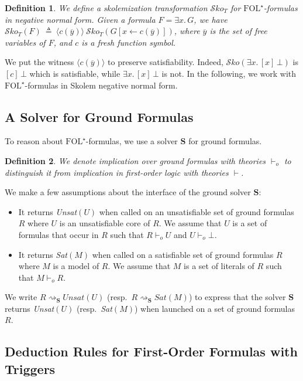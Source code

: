 \documentclass[]{easychair}
\newcommand{\GS}{\mathbf{S}}
\newcommand{\FOLT}{\mathrm{FOL}^\star}
\newcommand{\iFOL}{\vdash}
\newcommand{\sko}{\mathcal{S}\mathit{ko}}
\newcommand{\la}{\langle} \newcommand{\ra}{\rangle}
\newcommand{\eqdef}{\:\triangleq\:}
\newcommand{\beforesub}{\vspace{0cm}}
\newcommand{\aftersub}{\vspace{0cm}}
\newtheorem{definition}{Definition}[section]
\begin{document}
\begin{definition} We define a \emph{skolemization transformation} $\sko_T$
for $\FOLT$-for\-mu\-las in negative normal form.
Given a formula $F=\exists x.\,G$, we have
$\sko_T(F)\eqdef\la c(\overline y)\ra~\sko_T(G[x\leftarrow c(\overline y)])$,
where $\overline y$ is the set of free variables of $F$, and $c$ is a fresh
function symbol.
\end{definition}
We put the witness $\la c(\overline y)\ra$ to
preserve satisfiability. Indeed, $\sko(\exists x.\,[x]\,\bot)$
is $[c]\,\bot$ which is satisfiable, while $\exists x.\,[x]\,\bot$ is not.
In the following, we work with $\FOLT$-formulas in Skolem negative normal form.

\beforesub
\subsection{A Solver for Ground Formulas}
\aftersub

To reason about $\FOLT$-formulas, we use a solver $\GS$ for ground formulas.
\begin{definition} We denote implication over ground formulas with theories
$\vdash_o$ to distinguish it from implication in first-order logic with theories
$\iFOL$.
\end{definition}

We make a few assumptions about the interface of the ground solver $\GS$:
\begin{itemize}
 \item It returns \emph{Unsat$(U)$} when called on an unsatisfiable set of
ground
formulas $R$ where $U$ is an unsatisfiable core of $R$. We assume that $U$ is a
set of formulas that occur in $R$ such that $R\vdash_o U$
and $U\vdash_o\bot$.
 \item It returns \emph{Sat$(M)$} when called on a satisfiable set of ground
formulas $R$ where $M$ is a model of $R$. We assume that $M$ is a set of
literals of $R$ such that $M\vdash_o R$.
\end{itemize}
We write $R\rightsquigarrow_\GS\mathit{Unsat}(U)$
(resp.~$R\rightsquigarrow_\GS \mathit{Sat}(M)$)
to express that the solver $\GS$ returns
\emph{Unsat$(U)$} (resp.~\emph{Sat$(M)$})
when launched on a set of ground formulas $R$.

\beforesub
\subsection{Deduction Rules for First-Order Formulas with Triggers}
\aftersub
\end{document}
